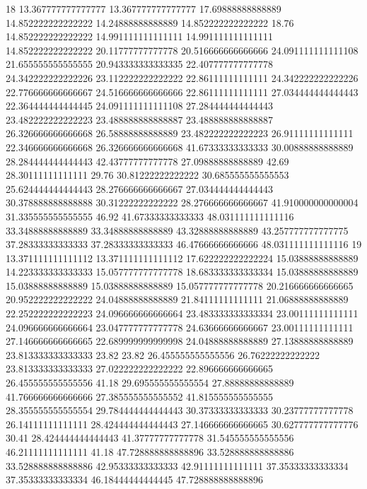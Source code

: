 18 13.367777777777777 13.367777777777777 17.69888888888889 14.852222222222222 14.24888888888889 14.852222222222222 18.76 14.852222222222222 14.991111111111111 14.991111111111111 14.852222222222222 20.11777777777778 20.516666666666666 24.091111111111108 21.655555555555555 20.943333333333335 22.407777777777778 24.342222222222226 23.112222222222222 22.86111111111111 24.342222222222226 22.776666666666667 24.516666666666666 22.86111111111111 27.034444444444443 22.364444444444445 24.091111111111108 27.284444444444443 23.482222222222223 23.488888888888887 23.488888888888887 26.326666666666668 26.58888888888889 23.482222222222223 26.91111111111111 22.346666666666668 26.326666666666668 41.67333333333333 30.00888888888889 28.284444444444443 42.43777777777778 27.09888888888889 42.69 28.30111111111111 29.76 30.81222222222222 30.685555555555553 25.624444444444443 28.276666666666667 27.034444444444443 30.378888888888888 30.31222222222222 28.276666666666667 41.910000000000004 31.335555555555555 46.92 41.67333333333333 48.031111111111116 33.34888888888889 33.34888888888889 43.32888888888889 43.257777777777775 37.28333333333333 37.28333333333333 46.47666666666666 48.031111111111116
19 13.371111111111112 13.371111111111112 17.622222222222224 15.03888888888889 14.223333333333333 15.057777777777778 18.683333333333334 15.03888888888889 15.03888888888889 15.03888888888889 15.057777777777778 20.216666666666665 20.952222222222222 24.04888888888889 21.84111111111111 21.06888888888889 22.252222222222223 24.096666666666664 23.483333333333334 23.00111111111111 24.096666666666664 23.047777777777778 24.63666666666667 23.00111111111111 27.146666666666665 22.689999999999998 24.04888888888889 27.13888888888889 23.813333333333333 23.82 23.82 26.455555555555556 26.76222222222222 23.813333333333333 27.022222222222222 22.896666666666665 26.455555555555556 41.18 29.695555555555554 27.88888888888889 41.766666666666666 27.385555555555552 41.815555555555555 28.355555555555554 29.784444444444443 30.37333333333333 30.23777777777778 26.14111111111111 28.424444444444443 27.146666666666665 30.627777777777776 30.41 28.424444444444443 41.37777777777778 31.545555555555556 46.21111111111111 41.18 47.728888888888896 33.528888888888886 33.528888888888886 42.95333333333333 42.91111111111111 37.35333333333334 37.35333333333334 46.18444444444445 47.728888888888896

